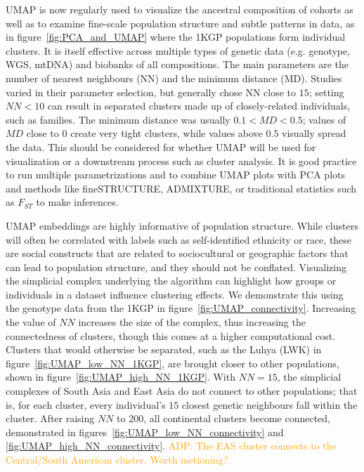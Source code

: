 \documentclass[12pt]{article}
\newcommand{\adpcomment}[1]{{\textcolor{orange}{ADP: #1}}}
\begin{document}
UMAP is now regularly used to visualize the ancestral composition of cohorts as well as to examine fine-scale population structure and subtle patterns in data, as in figure~\ref{fig:PCA_and_UMAP} where the 1KGP populations form individual clusters. It is itself effective across multiple types of genetic data (e.g. genotype, WGS, mtDNA) and biobanks of all compositions. The main parameters are the number of nearest neighbours (NN) and the minimum distance (MD). Studies varied in their parameter selection, but generally chose NN close to $15$; setting $NN < 10$ can result in separated clusters made up of closely-related individuals, such as families. The minimum distance was usually $0.1 < MD < 0.5$; values of $MD$ close to $0$ create very tight clusters, while values above $0.5$ visually spread the data. This should be considered for whether UMAP will be used for visualization or a downstream process such as cluster analysis. It is good practice to run multiple parametrizations and to combine UMAP plots with PCA plots and methods like fineSTRUCTURE\cite{lawson2012inference}, ADMIXTURE\cite{alexander2009fast}, or traditional statistics such as $F_{ST}$ to make inferences.

UMAP embeddings are highly informative of population structure. While clusters will often be correlated with labels such as self-identified ethnicity or race, these are social constructs that are related to sociocultural or geographic factors that can lead to population structure, and they should not be conflated. Visualizing the simplicial complex underlying the algorithm can highlight how groups or individuals in a dataset influence clustering effects. We demonstrate this using the genotype data from the 1KGP in figure~\ref{fig:UMAP_connectivity}. Increasing the value of $NN$ increases the size of the complex, thus increasing the connectedness of clusters, though this comes at a higher computational cost. Clusters that would otherwise be separated, such as the Luhya (LWK) in figure~\ref{fig:UMAP_low_NN_1KGP}, are brought closer to other populations, shown in figure~\ref{fig:UMAP_high_NN_1KGP}. With $NN=15$, the simplicial complexes of South Asia and East Asia do not connect to other populations; that is, for each cluster, every individual's $15$ closest genetic neighbours fall within the cluster. After raising $NN$ to $200$, all continental clusters become connected, demonstrated in figures~\ref{fig:UMAP_low_NN_connectivity} and \ref{fig:UMAP_high_NN_connectivity}. \adpcomment{The EAS cluster connects to the Central/South American cluster. Worth metioning?} 
\end{document}
